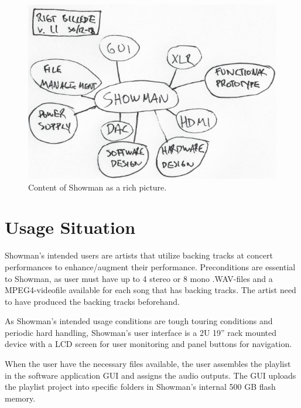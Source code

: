 \begin{figure}[htb!]
\centering
\includegraphics[scale=1]{./pictures/RigtBillede.png}
\caption{Content of Showman as a rich picture.}
\label{fig:RigtBillede.png}
\end{figure}


\section{Usage Situation} 

Showman's intended users are artists that utilize backing tracks at concert performances to enhance/augment their performance. Preconditions are essential to Showman, as user must have up to 4 stereo or 8 mono .WAV-files and a MPEG4-videofile available for each song that has backing tracks. The artist need to have produced the backing tracks beforehand. \newline

As Showman's intended usage conditions are tough touring conditions and periodic hard handling, Showman's user interface is a 2U 19'' rack mounted device with a LCD screen for user monitoring and panel buttons for navigation.   \newline

When the user have the necessary files available, the user assembles the playlist in the software application GUI and assigns the audio outputs. The GUI uploads the playlist project into specific folders in Showman's internal 500 GB flash memory. \newline

